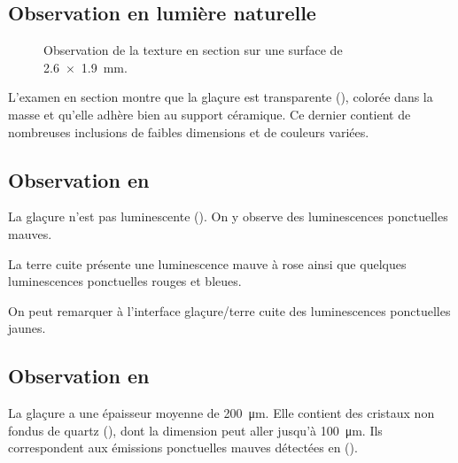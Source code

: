 \subsection{Observation en lumière naturelle}
\begin{figure}[htb]
  \begin{minipage}[t]{0.4\textwidth}
  \end{minipage}
  \begin{minipage}[t]{0.4\textwidth}
    \subcaption{\CL \label{texture:6531_CL}}
  \end{minipage}
  \caption[\ -- Observation de la texture en section]
          {\legendeD 
           Observation de la texture en section sur une surface de 
           \SI{2.6x1.9}{\mm}.}
  \label{texture:6531}
\end{figure}

L'examen en section montre que la glaçure est transparente 
(), colorée dans la masse et qu'elle 
adhère bien au support céramique. Ce dernier contient de nombreuses 
inclusions de faibles dimensions et de couleurs variées.

\subsection{Observation en \CL}
La glaçure n'est pas luminescente (). 
On y observe des luminescences ponctuelles mauves.

La terre cuite présente une luminescence mauve à rose ainsi que 
quelques luminescences ponctuelles rouges et bleues.

On peut remarquer à l'interface glaçure/terre cuite des luminescences 
ponctuelles jaunes.

\subsection{Observation en \MEB[ie]}
La glaçure a une épaisseur moyenne de \SI{200}{\um}. Elle contient 
des cristaux non fondus de quartz (), dont la dimension peut 
aller jusqu'à \SI{100}{\um}. Ils correspondent aux émissions 
ponctuelles mauves détectées en \CL ().

